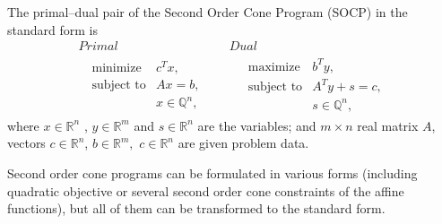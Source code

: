 \documentclass[12pt]{book}
\theoremstyle{definition}
\begin{document}
\label{defSOCP}
The primal--dual pair of the Second Order Cone Program (SOCP) in the standard form is
\begin{equation}
\label{socp} 
\begin{array}{cc}
Primal & Dual \\
\ \ \ \begin{array}{ll}
\mbox{minimize} & c^Tx,\\
\mbox{subject to}& Ax = b,\\
& x \in \mathbb{Q}^n,
\end{array} 
 \ \ \ \ \ & \ \ \ \ \ 
 \begin{array}{ll}
\mbox{maximize} & b^Ty,\\
\mbox{subject to}& A^Ty + s = c,\\
& s \in \mathbb{Q}^n,
\end{array}
\end{array}
\end{equation}
where $x\in \mathbb{R}^n$ , $y\in \mathbb{R}^m$ and $s\in \mathbb{R}^n$ are the variables; and $m\times n$ real matrix $A$, vectors $c\in \mathbb{R}^n$, $b\in \mathbb{R}^{m},$ $c\in \mathbb{R}^n$ are given problem data.

\rem Second order cone programs can be formulated in various forms (including quadratic objective or several second order cone constraints of the affine functions), but all of them can be transformed to the standard form. 
\end{document}
